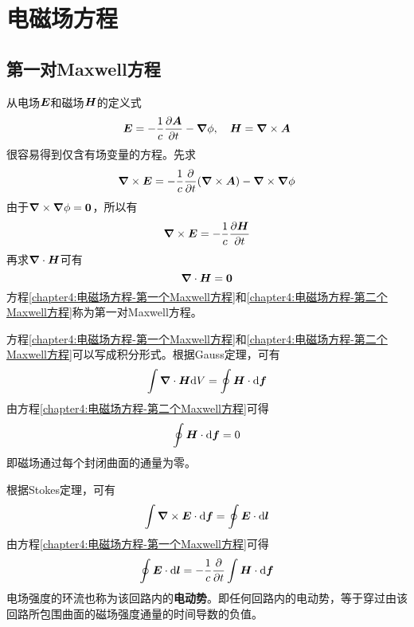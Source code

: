 \chapter{电磁场方程}

\section{第一对Maxwell方程}

从电场$\boldsymbol{E}$和磁场$\boldsymbol{H}$的定义式
\begin{equation*}
	\boldsymbol{E} = -\frac1c\frac{\partial \boldsymbol{A}}{\partial t}-\boldsymbol{\nabla} \phi,\quad \boldsymbol{H} = \boldsymbol{\nabla} \times \boldsymbol{A}
\end{equation*}
很容易得到仅含有场变量的方程。先求
\begin{equation*}
	\boldsymbol{\nabla} \times \boldsymbol{E} = -\frac1c \frac{\partial}{\partial t}(\boldsymbol{\nabla} \times \boldsymbol{A}) - \boldsymbol{\nabla} \times \boldsymbol{\nabla} \phi
\end{equation*}
由于$\boldsymbol{\nabla} \times \boldsymbol{\nabla} \phi=\boldsymbol{0}$，所以有
\begin{equation}
	\boldsymbol{\nabla} \times \boldsymbol{E} = -\frac1c \frac{\partial \boldsymbol{H}}{\partial t}
	\label{chapter4:电磁场方程-第一个Maxwell方程}
\end{equation}
再求$\boldsymbol{\nabla} \cdot\boldsymbol{H}$可有
\begin{equation}
	\boldsymbol{\nabla} \cdot \boldsymbol{H} = \boldsymbol{0}
	\label{chapter4:电磁场方程-第二个Maxwell方程}
\end{equation}
方程\eqref{chapter4:电磁场方程-第一个Maxwell方程}和\eqref{chapter4:电磁场方程-第二个Maxwell方程}称为第一对Maxwell方程。

方程\eqref{chapter4:电磁场方程-第一个Maxwell方程}和\eqref{chapter4:电磁场方程-第二个Maxwell方程}可以写成积分形式。根据Gauss定理，可有
\begin{equation*}
	\int \boldsymbol{\nabla} \cdot \boldsymbol{H}\mathrm{d} V = \oint \boldsymbol{H} \cdot \mathrm{d} \boldsymbol{f}
\end{equation*}
由方程\eqref{chapter4:电磁场方程-第二个Maxwell方程}可得
\begin{equation}
	\oint \boldsymbol{H}\cdot \mathrm{d} \boldsymbol{f} = 0
	\label{chapter4:电磁场方程-第二个Maxwell方程的积分形式}
\end{equation}
即磁场通过每个封闭曲面的通量为零。

根据Stokes定理，可有
\begin{equation*}
	\int \boldsymbol{\nabla} \times \boldsymbol{E}\cdot \mathrm{d} \boldsymbol{f} = \oint \boldsymbol{E}\cdot \mathrm{d} \boldsymbol{l}
\end{equation*}
由方程\eqref{chapter4:电磁场方程-第一个Maxwell方程}可得
\begin{equation}
	\oint \boldsymbol{E}\cdot \mathrm{d} \boldsymbol{l} = -\frac1c \frac{\partial}{\partial t}\int \boldsymbol{H}\cdot \mathrm{d} \boldsymbol{f}
	\label{chapter4:电磁场方程-第一个Maxwell方程的积分形式}
\end{equation}
电场强度的环流也称为该回路内的{\bf 电动势}。即任何回路内的电动势，等于穿过由该回路所包围曲面的磁场强度通量的时间导数的负值。

